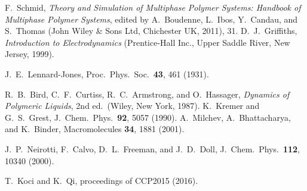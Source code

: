 F.~Schmid, \emph{Theory and Simulation of Multiphase Polymer Systems:
Handbook of Multiphase Polymer Systems}, edited by A.~Boudenne, L.~Ibos,
Y.~Candau, and S.~Thomas (John Wiley \& Sons Ltd, Chichester UK, 2011), 31.
%
D.~J.~Griffiths, \emph{Introduction to Electrodynamics} (Prentice-Hall Inc., Upper Saddle River, New Jersey, 1999).

J.~E.~Lennard-Jones, Proc.\ Phys.\ Soc.\  \textbf{43}, 461 (1931).


R.~B.\ Bird, C.~F.\ Curtiss, R.~C.\ Armstrong, and O.~Hassager,
\emph{Dynamics of Polymeric Liquids}, 2nd ed.\ (Wiley, New York,
1987).
%
K.~Kremer and G.~S.\ Grest, J.~Chem.\ Phys.\ \textbf{92}, 5057 (1990).
%
A.~Milchev, A.~Bhattacharya, and K.~Binder, Macromolecules \textbf{34},
1881 (2001).

J.~P.~Neirotti, F.~Calvo, D.~L.~Freeman, and J.~D.~Doll, J.~Chem.\ Phys.\ \textbf{112}, 10340 (2000).

T.~Koci and K.~Qi, proceedings of CCP2015 (2016).






